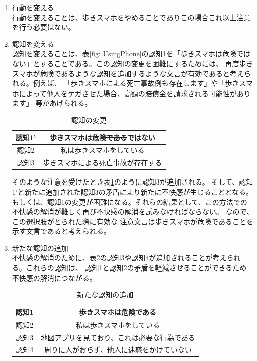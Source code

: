 \documentclass{kuisthesis}
\begin{document}
\begin{enumerate}
  \item 行動を変える \\
 行動を変えることは、歩きスマホをやめることでありこの場合これ以上注意を行う必要はない。

  \item 認知を変える \\
   認知を変えることは、表\ref{fig: UsingPhone}の認知1を「歩きスマホは危険ではない」とすることである。この認知の変更を困難にするためには、
  再度歩きスマホが危険であるような認知を追加するような文言が有効であると考えられる。例えば、
  「歩きスマホによる死亡事故例も存在します」や「歩きスマホによって他人をケガさせた場合、高額の賠償金を請求される可能性があります」
  等があげられる。
  \begin{table}[h]
    \centering
    \caption{認知の変更}
    \label{fig: AvoidDissonanceRevise}
    \begin{tabular}{c|c}
        認知1' & 歩きスマホは危険\sout{である}ではない \\ \hline
        認知2 & 私は歩きスマホをしている \\ \hline
        認知3 & 歩きスマホによる死亡事故が存在する \\
    \end{tabular}
  \end{table}
  そのような注意を受けたとき表\ref{fig: AvoidDissonanceRevise}のように認知3が追加される。
  そして、認知1'と新たに追加された認知3の矛盾により新たに不快感が生じることとなる。
  もしくは、認知1の変更が困難になる。それらの結果として、この方法での不快感の解消が難しく再び不快感の解消を試みなければならない。
  なので、この選択肢がとられた際に有効な
  注意文言は歩きスマホが危険であることを示す文言であると考えられる。

  \item 新たな認知の追加 \\
  不快感の解消のために、表\ref{fig: AvoidDissonance}の認知3や認知4が追加されることが考えられる。これらの認知は、
  認知1と認知2の矛盾を軽減させることができるため不快感の解消につながる。
  \begin{table}[h]
    \centering
    \caption{新たな認知の追加}
    \label{fig: AvoidDissonance}
    \begin{tabular}{c|c}
        認知1 & 歩きスマホは危険である \\ \hline
        認知2 & 私は歩きスマホをしている \\ \hline
        認知3 & 地図アプリを見ており、これは必要な行為である \\\hline
        認知4 & 周りに人がおらず、他人に迷惑をかけていない \\ 
    \end{tabular}
    

\end{table}
\end{enumerate}
\end{document}
